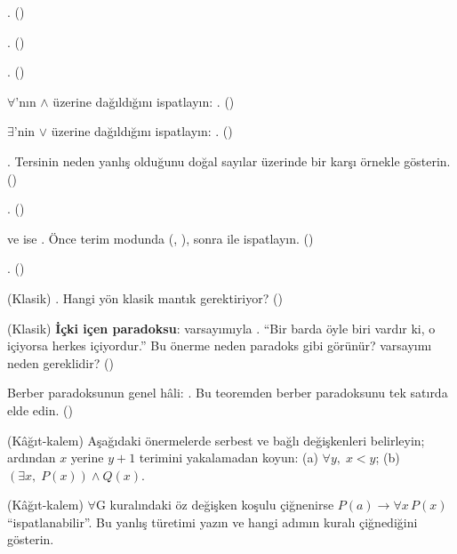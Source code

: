 \begin{alistirmalar}
 . ()

 . ()

 . ()

 $\forall$'nın $\wedge$ üzerine dağıldığını ispatlayın:
. ()

 $\exists$'nin $\vee$ üzerine dağıldığını ispatlayın:
. ()

 . Tersinin
neden yanlış olduğunu doğal sayılar üzerinde bir karşı örnekle
gösterin. ()

 . ()

  ve  ise . Önce terim modunda
(, ), sonra  ile ispatlayın. ()

 . ()

 (Klasik) . Hangi yön klasik
mantık gerektiriyor? ()

 (Klasik) \textbf{İçki içen paradoksu}: \lc{[Inhabited α]}
varsayımıyla . ``Bir barda öyle biri vardır ki,
o içiyorsa herkes içiyordur.'' Bu önerme neden paradoks gibi görünür?
 varsayımı neden gereklidir? ()

 Berber paradoksunun genel hâli:
. Bu teoremden berber paradoksunu
tek satırda elde edin. ()

 (Kâğıt-kalem) Aşağıdaki önermelerde serbest ve bağlı
değişkenleri belirleyin; ardından $x$ yerine $y + 1$ terimini
yakalamadan koyun:
(a) $\forall y,\; x < y$; \quad (b) $(\exists x,\; P(x)) \wedge Q(x)$.

 (Kâğıt-kalem) $\forall$G kuralındaki öz değişken koşulu
çiğnenirse $P(a) \to \forall x\,P(x)$ ``ispatlanabilir''. Bu yanlış
türetimi yazın ve hangi adımın kuralı çiğnediğini gösterin.
\end{alistirmalar}
